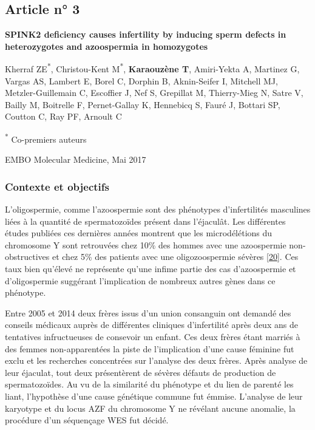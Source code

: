 \documentclass[12pt,twoside]{reedthesis}
\theoremstyle{definition}
\theoremstyle{definition}
\theoremstyle{remark}
\begin{document}
  \newpage
  
  \newpage  
  
  \subsection{Article n° 3}\label{article-n-3}
  
  \textbf{SPINK2 deficiency causes infertility by inducing sperm defects
  in heterozygotes and azoospermia in homozygotes}
  
  Kherraf ZE\textsuperscript{*}, Christou-Kent M\textsuperscript{*},
  \textbf{Karaouzène T}, Amiri-Yekta A, Martinez G, Vargas AS, Lambert E,
  Borel C, Dorphin B, Aknin-Seifer I, Mitchell MJ, Metzler-Guillemain C,
  Escoffier J, Nef S, Grepillat M, Thierry-Mieg N, Satre V, Bailly M,
  Boitrelle F, Pernet-Gallay K, Hennebicq S, Fauré J, Bottari SP, Coutton
  C, Ray PF, Arnoult C
  
  \textsuperscript{*} Co-premiers auteurs
  
  EMBO Molecular Medicine, Mai 2017
  
  \newpage
  
  \subsubsection{Contexte et objectifs}\label{contexte-et-objectifs}
  
  L'oligospermie, comme l'azoospermie sont des phénotypes d'infertilités
  masculines liées à la quantité de spermatozoïdes présent dans
  l'éjaculât. Les différentes études publiées ces dernières années
  montrent que les microdélétions du chromosome Y sont retrouvées chez
  10\% des hommes avec une azoospermie non-obstructives et chez 5\% des
  patients avec une oligozoospermie sévères
  {[}\protect\hyperlink{ref-Hotaling2014}{20}{]}. Ces taux bien qu'élevé
  ne représente qu'une infime partie des cas d'azoospermie et
  d'oligospermie suggérant l'implication de nombreux autres gènes dans ce
  phénotype.
  
  Entre 2005 et 2014 deux frères issus d'un union consanguin ont demandé
  des conseils médicaux auprès de différentes cliniques d'infertilité
  après deux ans de tentatives infructueuses de consevoir un enfant. Ces
  deux frères étant marriés à des femmes non-apparentées la piste de
  l'implication d'une cause féminine fut exclu et les recherches
  concentrées sur l'analyse des deux frères. Après analyse de leur
  éjaculat, tout deux présentèrent de sévères défauts de production de
  spermatozoïdes. Au vu de la similarité du phénotype et du lien de
  parenté les liant, l'hypothèse d'une cause génétique commune fut émmise.
  L'analyse de leur karyotype et du locus AZF du chromosome Y ne révélant
  aucune anomalie, la procédure d'un séquençage WES fut décidé.
  
\end{document}
